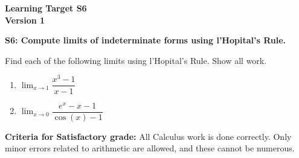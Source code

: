 \documentclass[10pt]{article}
\begin{document}
	\vspace*{0in}

		\begin{center}
			\textbf{Learning Target S6 \\
			Version 1} 
		\end{center}


\begin{framed}
	\textbf{S6: Compute limits of indeterminate forms using l'Hopital's Rule.}
\end{framed}

Find each of the following limits using l'Hopital's Rule. Show all work. 

\begin{enumerate}
    \item $\displaystyle{\lim_{x \to 1} \dfrac{x^3 - 1}{x - 1}}$
    \item $\displaystyle{\lim_{x \to 0} \dfrac{e^x - x - 1}{\cos(x) - 1}}$
\end{enumerate}

\vfill


\begin{small}
    \begin{framed}
        	\textbf{Criteria for Satisfactory grade:} All Calculus work is done correctly. Only minor errors related to arithmetic are allowed, and these cannot be numerous. 
    \end{framed}

\end{small}
\end{document}
